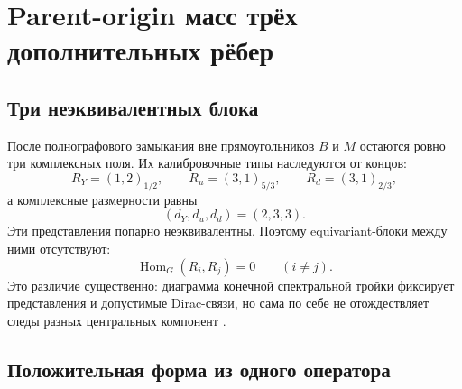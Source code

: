 \chapter{Parent-origin масс трёх дополнительных рёбер}
\label{ch:v8-baryon-c0-extra-edge-mass-parent-origin}

\section{Три неэквивалентных блока}

После полнографового замыкания вне прямоугольников $B$ и $M$ остаются
ровно три комплексных поля. Их калибровочные типы наследуются от концов:
\begin{equation}
 R_Y=(1,2)_{1/2},\qquad
 R_u=(3,1)_{5/3},\qquad
 R_d=(3,1)_{2/3},
 \label{eq:v8-extra-edge-mass-representations}
\end{equation}
а комплексные размерности равны
\begin{equation}
 (d_Y,d_u,d_d)=(2,3,3).
 \label{eq:v8-extra-edge-mass-dimensions}
\end{equation}
Эти представления попарно неэквивалентны. Поэтому equivariant-блоки между
ними отсутствуют:
\begin{equation}
 \operatorname{Hom}_{G}(R_i,R_j)=0\qquad(i\ne j).
 \label{eq:v8-extra-edge-mass-schur-separation}
\end{equation}
Это различие существенно: диаграмма конечной спектральной тройки фиксирует
представления и допустимые Dirac-связи, но сама по себе не отождествляет
следы разных центральных компонент \cite{v8-extra-edge-mass-krajewski,
v8-extra-edge-mass-cacic}.

\section{Положительная форма из одного оператора}

